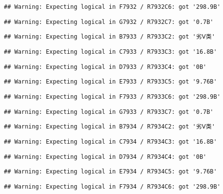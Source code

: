 \documentclass[
]{article}
\begin{document}
\begin{verbatim}
## Warning: Expecting logical in F7932 / R7932C6: got '298.9B'
\end{verbatim}

\begin{verbatim}
## Warning: Expecting logical in G7932 / R7932C7: got '0.7B'
\end{verbatim}

\begin{verbatim}
## Warning: Expecting logical in B7933 / R7933C2: got '劣Ⅴ类'
\end{verbatim}

\begin{verbatim}
## Warning: Expecting logical in C7933 / R7933C3: got '16.8B'
\end{verbatim}

\begin{verbatim}
## Warning: Expecting logical in D7933 / R7933C4: got '0B'
\end{verbatim}

\begin{verbatim}
## Warning: Expecting logical in E7933 / R7933C5: got '9.76B'
\end{verbatim}

\begin{verbatim}
## Warning: Expecting logical in F7933 / R7933C6: got '298.9B'
\end{verbatim}

\begin{verbatim}
## Warning: Expecting logical in G7933 / R7933C7: got '0.7B'
\end{verbatim}

\begin{verbatim}
## Warning: Expecting logical in B7934 / R7934C2: got '劣Ⅴ类'
\end{verbatim}

\begin{verbatim}
## Warning: Expecting logical in C7934 / R7934C3: got '16.8B'
\end{verbatim}

\begin{verbatim}
## Warning: Expecting logical in D7934 / R7934C4: got '0B'
\end{verbatim}

\begin{verbatim}
## Warning: Expecting logical in E7934 / R7934C5: got '9.76B'
\end{verbatim}

\begin{verbatim}
## Warning: Expecting logical in F7934 / R7934C6: got '298.9B'
\end{verbatim}
\end{document}
